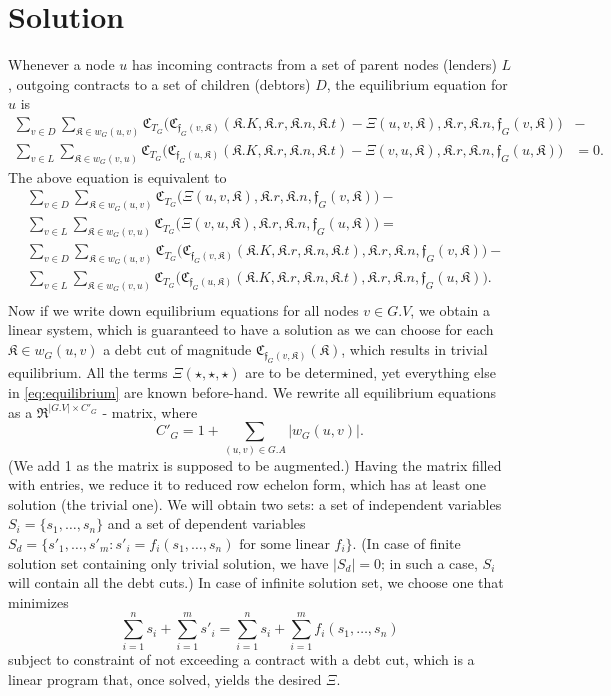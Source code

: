\documentclass[10pt]{article}
\newcommand{\RR}{\mathfrak{R}}
\newcommand{\KK}{\mathfrak{K}}
\newcommand{\CC}{\mathfrak{C}}
\newcommand{\ff}{\mathfrak{f}}
\begin{document}
\section{Solution}
Whenever a node $u$ has incoming contracts from a set of parent nodes (lenders) $L$, outgoing contracts to a set of children (debtors) $D$, the equilibrium equation for $u$ is
\begin{equation*}
\begin{aligned}
\sum_{v \in D} \sum_{\KK \in w_G(u, v)} \CC_{T_G} \big( \CC_{\ff_G(v, \KK)} ( \KK.K, \KK.r, \KK.n, \KK.t ) - \Xi(u, v, \KK), \KK.r, \KK.n, \ff_G(v, \KK) \big ) & - \\ 
\sum_{v \in L} \sum_{\KK \in w_G(v, u)} \CC_{T_G} \big( \CC_{\ff_G(u, \KK)} ( \KK.K, \KK.r, \KK.n, \KK.t ) - \Xi(v, u, \KK), \KK.r, \KK.n, \ff_G(u, \KK) \big) & = 0.
\end{aligned}
\end{equation*}
The above equation is equivalent to
\begin{equation}
\label{eq:equilibrium}
\begin{aligned}
& \sum_{v \in D} \sum_{\KK \in w_G(u, v)} \CC_{T_G} \big( \Xi(u, v, \KK), \KK.r, \KK.n, \ff_G(v, \KK) \big) - \\
& \sum_{v \in L} \sum_{\KK \in w_G(v, u)} \CC_{T_G} \big( \Xi(v, u, \KK), \KK.r, \KK.n, \ff_G(u, \KK) \big) = \\
& \sum_{ v \in D } \sum_{ \KK \in w_G(u, v) } \CC_{T_G} \big( \CC_{ \ff_G(v, \KK) } (\KK.K, \KK.r, \KK.n, \KK.t), \KK.r, \KK.n, \ff_G( v, \KK ) \big) - \\
& \sum_{ v \in L } \sum_{ \KK \in w_G(v, u) } \CC_{T_G} \big( \CC_{ \ff_G(u, \KK) } (\KK.K, \KK.r, \KK.n, \KK.t), \KK.r, \KK.n, \ff_G( u , \KK) \big). \\
\end{aligned}
\end{equation}
Now if we write down equilibrium equations for all nodes $v \in G.V$, we obtain a linear system, which is guaranteed to have a solution as we can choose for each $\KK \in w_G(u, v)$ a debt cut of magnitude $\CC_{\ff_G(v, \KK)}(\KK)$, which results in trivial equilibrium. All the terms $\Xi(\star, \star, \star)$ are to be determined, yet everything else in \eqref{eq:equilibrium} are known before-hand. We rewrite all equilibrium equations as a $\RR^{|G.V| \times C'_G}$ - matrix, where 
\[
C'_G = 1 + \sum_{(u, v) \in G.A} |w_G(u, v)|.
\]
(We add 1 as the matrix is supposed to be augmented.) Having the matrix filled with entries, we reduce it to reduced row echelon form, which has at least one solution (the trivial one).
We will obtain two sets: a set of independent variables $S_i = \{ s_1, \dots, s_n \}$ and a set of dependent variables $S_d = \{ s'_1, \dots, s'_m \colon s'_i = f_i(s_1, \dots, s_n) \text{ for some linear } f_i \}$. (In case of finite solution set containing only trivial solution, we have $|S_d| = 0$; in such a case, $S_i$ will contain all the debt cuts.) In case of infinite solution set, we choose one that minimizes
\[
\sum_{i = 1}^{n} s_i + \sum_{i = 1}^{m} s'_i = \sum_{i = 1}^{n} s_i + \sum_{i = 1}^{m} f_i(s_1, \dots, s_n) 
\]
subject to constraint of not exceeding a contract with a debt cut, which is a linear program that, once solved, yields the desired $\Xi$.
\end{document}
